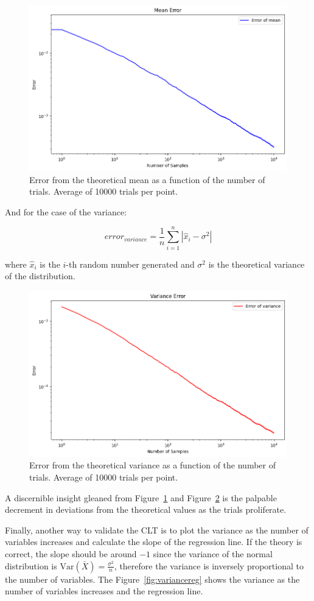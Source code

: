 \documentclass{report}
\begin{document}
\begin{figure}[H]
	\centering
	\includegraphics[width=0.5\linewidth]{./Figures/CLT/meanerror.png}
	\caption{Error from the theoretical mean as a function of the number of trials. Average of 10000 trials per point.}
	\label{fig:meanerror}
\end{figure}

And for the case of the variance:

\begin{equation*} error_{variance} = \frac{1}{n}\sum_{i=1}^{n} | \hat{x}_i - \sigma^2 | \end{equation*}

where \(\hat{x}_i\) is the \(i\)-th random number generated and \(\sigma^2\) is the theoretical variance of the distribution.

\begin{figure}[H]
	\centering
	\includegraphics[width=0.5\linewidth]{./Figures/CLT/varianceerror.png}
	\caption{Error from the theoretical variance as a function of the number of trials. Average of 10000 trials per point.}
	\label{fig:varianceerror}
\end{figure}

A discernible insight gleaned from Figure~\ref{fig:meanerror} and Figure~\ref{fig:varianceerror} is the palpable decrement in deviations from the theoretical values as the trials proliferate. 

Finally, another way to validate the CLT is to plot the variance as the number of variables increases and calculate the slope of the regression line. If the theory is correct, the slope should be around \(-1\) since the variance of the normal distribution is \(\mathrm{Var}(\bar{X}) = \frac{\sigma^2}{n}\), therefore the variance is inversely proportional to the number of variables. The Figure~\ref{fig:variancereg} shows the variance as the number of variables increases and the regression line.
\end{document}
